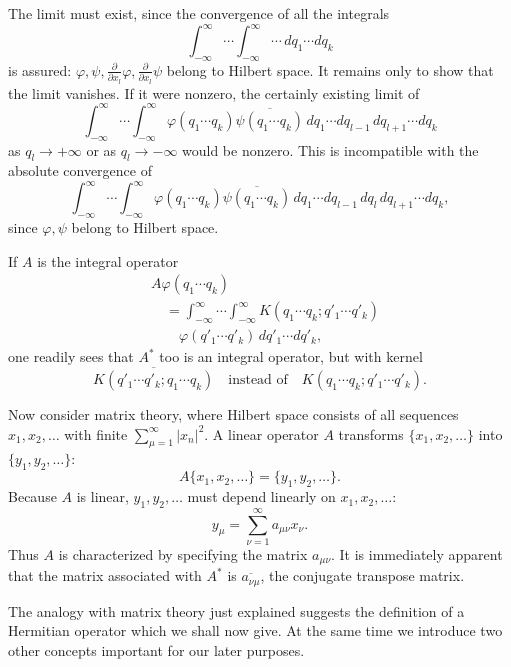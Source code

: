 \documentclass[fontsize=13pt,twoside,openany,headings=normal,parskip=false,bookmarkpackage=false,DIV=calc]{scrbook}
\begin{document}
The limit must exist, since the convergence of all the integrals
\[
\int_{-\infty}^{\infty}\cdots\int_{-\infty}^{\infty}\cdots\,dq_1\cdots dq_k
\]
is assured: $\varphi,\psi,\frac{\partial}{\partial x_l}\varphi,\frac{\partial}{\partial x_l}\psi$ belong to Hilbert space. It remains only to show that the limit vanishes. If it were nonzero, the certainly existing limit of
\[
\int_{-\infty}^{\infty}\cdots\int_{-\infty}^{\infty}\varphi(q_1\cdots q_k)\overline{\psi(q_1\cdots q_k)}\,dq_1\cdots dq_{l-1}\,dq_{l+1}\cdots dq_k
\]
as $q_l\to+\infty$ or as $q_l\to-\infty$ would be nonzero. This is incompatible with the absolute convergence of
\[
\int_{-\infty}^{\infty}\cdots\int_{-\infty}^{\infty}\varphi(q_1\cdots q_k)\overline{\psi(q_1\cdots q_k)}\,dq_1\cdots dq_{l-1}\,dq_l\,dq_{l+1}\cdots dq_k,
\]
since $\varphi,\psi$ belong to Hilbert space.

\hypertarget{origpage-50}{}%
If $A$ is the integral operator
\begin{align*}
&A\varphi(q_1\cdots q_k)\\
&\quad=\int_{-\infty}^{\infty}\cdots\int_{-\infty}^{\infty}K(q_1\cdots q_k;q'_1\cdots q'_k)\\
&\qquad\varphi(q'_1\cdots q'_k)\,dq'_1\cdots dq'_k,
\end{align*}
one readily sees that $A^*$ too is an integral operator, but with kernel
\[
\overline{K(q'_1\cdots q'_k;q_1\cdots q_k)}
\quad\text{instead of}\quad K(q_1\cdots q_k;q'_1\cdots q'_k).
\]

Now consider matrix theory, where Hilbert space consists of all sequences $x_1,x_2,\ldots$ with finite $\sum_{\mu=1}^\infty|x_n|^2$. A linear operator $A$ transforms $\{x_1,x_2,\ldots\}$ into $\{y_1,y_2,\ldots\}$:
\[
A\{x_1,x_2,\ldots\}=\{y_1,y_2,\ldots\}.
\]
Because $A$ is linear, $y_1,y_2,\ldots$ must depend linearly on $x_1,x_2,\ldots$:
\[
y_\mu=\sum_{\nu=1}^\infty a_{\mu\nu}x_\nu.
\]
Thus $A$ is characterized by specifying the matrix $a_{\mu\nu}$. It is immediately apparent that the matrix associated with $A^*$ is $\overline{a_{\nu\mu}}$, the conjugate transpose matrix.

The analogy with matrix theory just explained suggests the definition of a Hermitian operator which we shall now give. At the same time we introduce two other concepts important for our later purposes.
\end{document}
